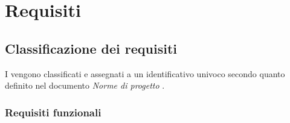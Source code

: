 \documentclass[AnalisiDeiRequisiti.tex]{subfiles}
\begin{document}

\chapter{Requisiti}
\section{Classificazione dei requisiti}
I  vengono classificati e assegnati a un identificativo univoco secondo quanto definito nel documento \textit{Norme di progetto \vrdue}.

\subsection{Requisiti funzionali}
\end{document}
